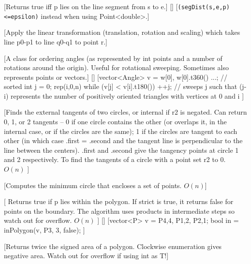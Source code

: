 [Returns true iff p lies on the line segment from s to e.]
[]
[\texttt{(segDist(s,e,p)<=epsilon)} instead when using Point<double>.]

[Apply the linear transformation (translation, rotation and scaling) which takes line p0-p1 to line q0-q1 to point r.]

[A class for ordering angles (as represented by int points and  a number of rotations around the origin). 
Useful for rotational sweeping. Sometimes also represents points or vectors.]%
[]
[vector<Angle> v = {w[0], w[0].t360() ...}; // sorted
  int j = 0; rep(i,0,n) { while (v[j] < v[i].t180()) ++j; }
  // sweeps j such that (j-i) represents the number of positively oriented triangles with vertices at 0 and i
]


[Finds the external tangents of two circles, or internal if r2 is negated.
 Can return 0, 1, or 2 tangents -- 0 if one circle contains the other (or overlaps it, in the internal case, or if the circles are the same);
 1 if the circles are tangent to each other (in which case .first = .second and the tangent line is perpendicular to the line between the centers).
 .first and .second give the tangency points at circle 1 and 2 respectively.
 To find the tangents of a circle with a point set r2 to 0. $O(n)$
 ]

 [Computes the minimum circle that encloses a set of points. $O(n)$]

 [
 Returns true if p lies within the polygon. If strict is true, it returns false for 
 points on the boundary. The algorithm uses products in intermediate steps so watch out for overflow. $O(n)$
 ]
 []
 [vector<P> v = {P{4,4}, P{1,2}, P{2,1}};
 bool in = inPolygon(v, P{3, 3}, false);
 ]

[Returns twice the signed area of a polygon. Clockwise enumeration gives negative area. 
Watch out for overflow if using int as T!]

